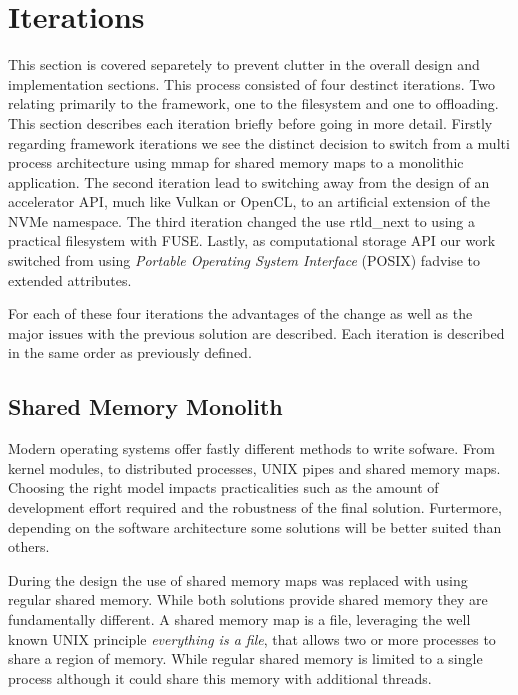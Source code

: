 
\section{Iterations}

This section is covered separetely to prevent clutter in the overall design and
implementation sections. This process consisted of four destinct iterations.
Two relating primarily to the framework, one to the filesystem and one to
offloading. This section describes each iteration briefly before going in more
detail. Firstly regarding framework iterations we see the distinct decision
to switch from a multi process architecture using mmap for shared memory maps to
a monolithic application. The second iteration lead to switching away from the
design of an accelerator API, much like Vulkan or OpenCL, to an artificial
extension of the NVMe namespace. The third iteration changed the use
rtld\_next \cite{rtldnext} to using a practical filesystem with FUSE. Lastly, as
computational storage API our work switched from using
\textit{Portable Operating System Interface} (POSIX) fadvise \cite{fadvise} to
extended attributes.

For each of these four iterations the advantages of the change as well as the
major issues with the previous solution are described. Each iteration is
described in the same order as previously defined.

\subsection{Shared Memory Monolith}

Modern operating systems offer fastly different methods to write sofware. From
kernel modules, to distributed processes, UNIX pipes and shared memory maps.
Choosing the right model impacts practicalities such as the amount of
development effort required and the robustness of the final solution. 
Furtermore, depending on the software architecture some solutions will be better
suited than others.

During the design the use of shared memory maps was replaced with using regular
shared memory. While both solutions provide shared memory they are fundamentally
different. A shared memory map is a file, leveraging the well known UNIX
principle \textit{everything is a file}, that allows two or more processes to
share a region of memory. While regular shared memory is limited to a single
process although it could share this memory with additional threads.

